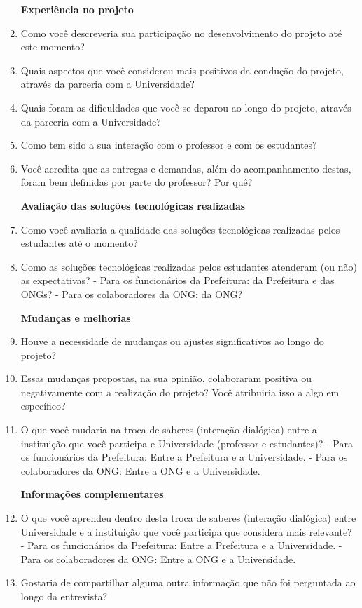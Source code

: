 \begin{enumerate}
\par\vspace{1\baselineskip}
\textbf{Experiência no projeto}
    \item Como você descreveria sua participação no desenvolvimento do projeto até este momento?
    \item Quais aspectos que você considerou mais positivos da condução do projeto, através da parceria com a Universidade?
    \item Quais foram as dificuldades que você se deparou ao longo do projeto, através da parceria com a Universidade?
    \item Como tem sido a sua interação com o professor e com os estudantes?
    \item Você acredita que as entregas e demandas, além do acompanhamento destas, foram bem definidas por parte do professor? Por quê?
\par\vspace{1\baselineskip}
\textbf{Avaliação das soluções tecnológicas realizadas}
    \item Como você avaliaria a qualidade das soluções tecnológicas realizadas pelos estudantes até o momento?
    \item Como as soluções tecnológicas realizadas pelos estudantes atenderam (ou não) as expectativas?
     - Para os funcionários da Prefeitura: da Prefeitura e das \gls{ONG}s?
    - Para os colaboradores da \gls{ONG}: da \gls{ONG}?
\par\vspace{1\baselineskip}
\textbf{Mudanças e melhorias}
    \item Houve a necessidade de mudanças ou ajustes significativos ao longo do projeto?
    \item Essas mudanças propostas, na sua opinião, colaboraram positiva ou negativamente com a realização do projeto? Você atribuiria isso a algo em específico?
    \item O que você mudaria na troca de saberes (interação dialógica) entre a instituição que você participa e Universidade (professor e estudantes)?
     - Para os funcionários da Prefeitura: Entre a Prefeitura e a Universidade.
    - Para os colaboradores da \gls{ONG}: Entre a \gls{ONG} e a Universidade.
\par\vspace{1\baselineskip}
\textbf{Informações complementares}
    \item O que você aprendeu dentro desta troca de saberes (interação dialógica) entre Universidade e a instituição que você participa que considera mais relevante?
     - Para os funcionários da Prefeitura: Entre a Prefeitura e a Universidade.
    - Para os colaboradores da \gls{ONG}: Entre a \gls{ONG} e a Universidade.
    \item Gostaria de compartilhar alguma outra informação que não foi perguntada ao longo da entrevista?
\end{enumerate}
